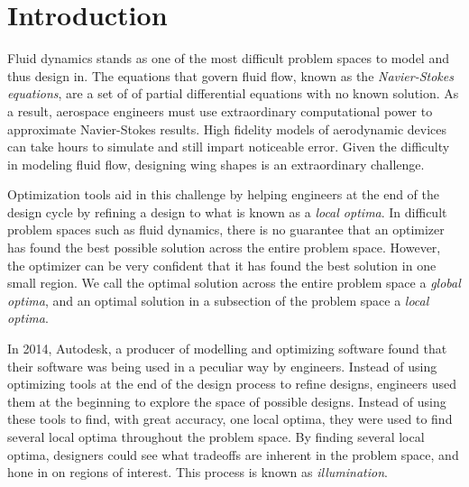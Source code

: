 \documentclass{sig-alternate}
\begin{document}
\begin{abstract}
\begin{comment}
This paper conducts two different experiments to test SAIL's viability in the context of aerospace engineering.
The first test attempts to design a set of two dimensional airfoils. A second test was added to design the three dimensional shape of a velomobile.
This second test was deemed important as the model to test it was much more complicated than its two dimensional counterpart.
This difficult model would stress SAIL's Surrogate Assisted model to a greater extent.
\end{comment}
\end{abstract}


\section{Introduction}
\label{sec:introduction}

Fluid dynamics stands as one of the most difficult problem spaces to model and thus design in.
The equations that govern fluid flow, known as the \textit{Navier-Stokes equations}, are a set of of partial differential equations with no known solution.
As a result, aerospace engineers must use extraordinary computational power to approximate Navier-Stokes results.
High fidelity models of aerodynamic devices can take hours to simulate and still impart noticeable error.
Given the difficulty in modeling fluid flow, designing wing shapes is an extraordinary challenge.

Optimization tools aid in this challenge by helping engineers at the end of the design cycle by refining a design to what is known as a \textit{local optima}.
In difficult problem spaces such as fluid dynamics, there is no guarantee that an optimizer has found the best possible solution across the entire problem space.
However, the optimizer can be very confident that it has found the best solution in one small region.
We call the optimal solution across the entire problem space a \textit{global optima}, and an optimal solution in a subsection of the problem space a \textit{local optima}. 

In 2014, Autodesk, a producer of modelling and optimizing software found that their software was being used in a peculiar way by engineers.
Instead of using optimizing tools at the end of the design process to refine designs, engineers used them at the beginning to explore the space of possible designs\cite{Bradner:2014:PTD:2664323.2664349}.
Instead of using these tools to find, with great accuracy, one local optima, they were used to find several local optima throughout the problem space.
By finding several local optima, designers could see what tradeoffs are inherent in the problem space, and hone in on regions of interest.
This process is known as \textit{illumination}.
\end{document}
